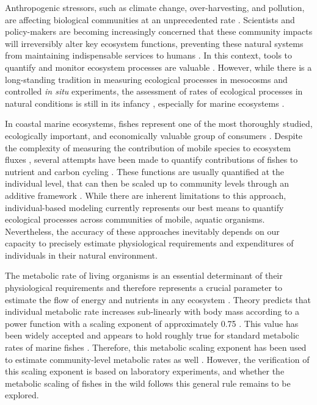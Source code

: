 \documentclass[
]{article}
\begin{document}
Anthropogenic stressors, such as climate change, over-harvesting, and
pollution, are affecting biological communities at an unprecedented rate
\citep{Halpern2008, Venter2016}. Scientists and policy-makers are
becoming increasingly concerned that these community impacts will
irreversibly alter key ecosystem functions, preventing these natural
systems from maintaining indispensable services to humans
\citep{Cardinale2012}. In this context, tools to quantify and monitor
ecosystem processes are valuable \citep{Tilman2014}. However, while
there is a long-standing tradition in measuring ecological processes in
mesocosms and controlled \emph{in situ} experiments, the assessment of
rates of ecological processes in natural conditions is still in its
infancy \citep{Reich2012}, especially for marine ecosystems
\citep{Brandl2019front}.

\par

In coastal marine ecosystems, fishes represent one of the most
thoroughly studied, ecologically important, and economically valuable
group of consumers \citep{Bozec2004, Tamayo2018}. Despite the complexity
of measuring the contribution of mobile species to ecosystem fluxes
\citep{Wilson2010}, several attempts have been made to quantify
contributions of fishes to nutrient and carbon cycling
\citep{Villeger2017, Brandl2019front}. These functions are usually
quantified at the individual level, that can then be scaled up to
community levels through an additive framework
\citep{Barneche2014, Allgeier2014, Brandl2019science, Morais2019}. While
there are inherent limitations to this approach, individual-based
modeling currently represents our best means to quantify ecological
processes across communities of mobile, aquatic organisms. Nevertheless,
the accuracy of these approaches inevitably depends on our capacity to
precisely estimate physiological requirements and expenditures of
individuals in their natural environment.

\par

The metabolic rate of living organisms is an essential determinant of
their physiological requirements and therefore represents a crucial
parameter to estimate the flow of energy and nutrients in any ecosystem
\citep{Brown2004, Allen2005}. Theory predicts that individual metabolic
rate increases sub‐linearly with body mass according to a power function
with a scaling exponent of approximately 0.75
\citep{West1997, Gillooly2001, Brown2004}. This value has been widely
accepted and appears to hold roughly true for standard metabolic rates
of marine fishes \citep{Barneche2014}. Therefore, this metabolic scaling
exponent has been used to estimate community-level metabolic rates as
well \citep[e.g.,][]{Deutsch2015, Holt2015, Cheung2013}. However, the
verification of this scaling exponent is based on laboratory
experiments, and whether the metabolic scaling of fishes in the wild
follows this general rule remains to be explored.
\end{document}
